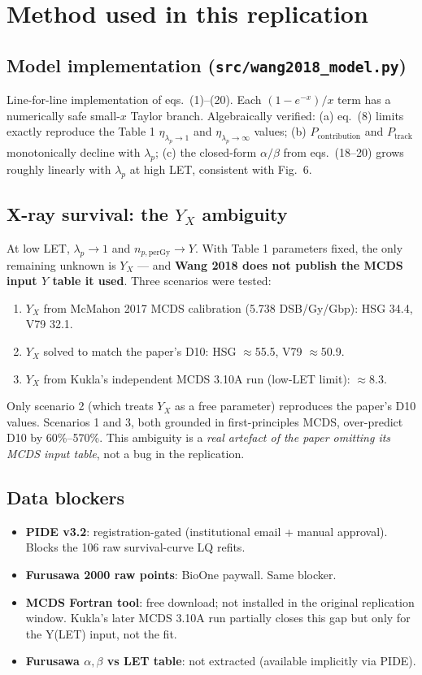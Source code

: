 \documentclass[11pt]{article}
\begin{document}
\section{Method used in this replication}

\subsection{Model implementation (\texttt{src/wang2018\_model.py})}
Line-for-line implementation of eqs.\ (1)--(20). Each $(1 - e^{-x})/x$ term has a numerically safe small-$x$ Taylor branch. Algebraically verified: (a) eq.\ (8) limits exactly reproduce the Table 1 $\eta_{\lambda_p\to 1}$ and $\eta_{\lambda_p\to\infty}$ values; (b) $P_{\text{contribution}}$ and $P_{\text{track}}$ monotonically decline with $\lambda_p$; (c) the closed-form $\alpha/\beta$ from eqs.\ (18--20) grows roughly linearly with $\lambda_p$ at high LET, consistent with Fig.\ 6.

\subsection{X-ray survival: the $Y_X$ ambiguity}
At low LET, $\lambda_p \to 1$ and $n_{p,\text{perGy}} \to Y$. With Table 1 parameters fixed, the only remaining unknown is $Y_X$ --- and \textbf{Wang 2018 does not publish the MCDS input $Y$ table it used}. Three scenarios were tested:

\begin{enumerate}[nosep,leftmargin=1.4em]
\item $Y_X$ from McMahon 2017 MCDS calibration (5.738 DSB/Gy/Gbp): HSG 34.4, V79 32.1.
\item $Y_X$ solved to match the paper's D10: HSG $\approx$55.5, V79 $\approx$50.9.
\item $Y_X$ from Kukla's independent MCDS 3.10A run (low-LET limit): $\approx$8.3.
\end{enumerate}

Only scenario 2 (which treats $Y_X$ as a free parameter) reproduces the paper's D10 values. Scenarios 1 and 3, both grounded in first-principles MCDS, over-predict D10 by 60\%--570\%. This ambiguity is a \emph{real artefact of the paper omitting its MCDS input table}, not a bug in the replication.

\subsection{Data blockers}
\begin{itemize}[nosep,leftmargin=1.4em]
\item \textbf{PIDE v3.2}: registration-gated (institutional email + manual approval). Blocks the 106 raw survival-curve LQ refits.
\item \textbf{Furusawa 2000 raw points}: BioOne paywall. Same blocker.
\item \textbf{MCDS Fortran tool}: free download; not installed in the original replication window. Kukla's later MCDS 3.10A run partially closes this gap but only for the Y(LET) input, not the fit.
\item \textbf{Furusawa $\alpha,\beta$ vs LET table}: not extracted (available implicitly via PIDE).
\end{itemize}
\end{document}

